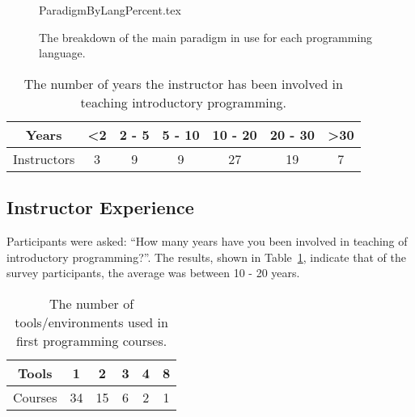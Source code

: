 \documentclass{sig-alternate}
\begin{document}
%


\begin{figure}
\begin{center}
{ParadigmByLangPercent.tex}
\end{center}\vskip-18pt
\caption{The breakdown of the main paradigm in use for each programming language.}
\end{figure}


\begin{table}[h]
\centering
\caption{The number of years the instructor has been involved in teaching introductory programming.}
\label{tab:yearsTeaching}
\begin{tabular}{ccccccc}
\hline
Years       & \textless 2 & 2 - 5 & 5 - 10 & 10 - 20 & 20 - 30 & \textgreater 30 \\ \hline
Instructors & 3          & 9     & 9      & 27      & 19      & 7              \\ \hline
\end{tabular}
\end{table}

\subsection{Instructor Experience}

Participants were asked: ``How many years have you been involved in
teaching of introductory programming?''. The results, shown in
Table~\ref{tab:yearsTeaching}, indicate that of the survey
participants, the average was between 10 - 20 years.

\begin{table}[]
\centering
\caption{The number of tools/environments used in first programming courses.}
\label{tab:numTools}
\begin{tabular}{cccccc}
\hline
Tools   & 1  & 2  & 3 & 4 & 8 \\ \hline
Courses & 34 & 15 & 6 & 2 & 1 \\ \hline
\end{tabular}
\end{table}
\end{document}
